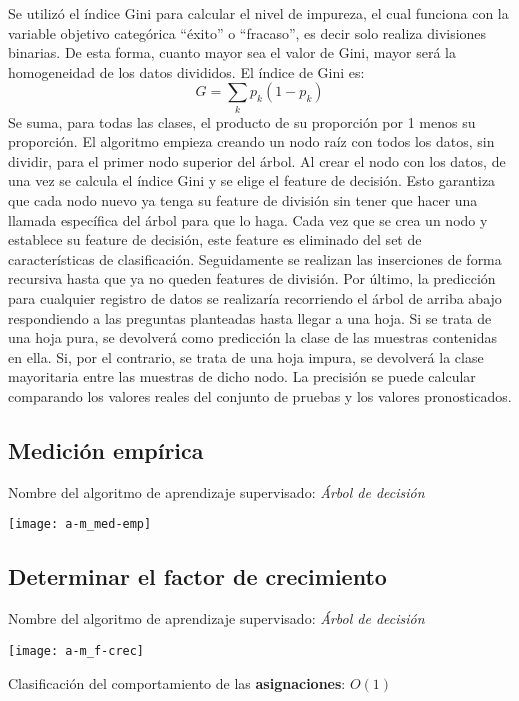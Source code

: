 \documentclass{article}
\begin{document}
Se utilizó el índice Gini para calcular el nivel de impureza, el cual funciona con la variable objetivo categórica “éxito” o  “fracaso”, es decir solo realiza divisiones binarias. De esta forma, cuanto mayor sea el valor de Gini, mayor será la homogeneidad de los datos divididos.
El índice de Gini es: \[G = \sum_{k}p_{k}(1-p_{k})\]
Se suma, para todas las clases, el producto de su proporción por 1 menos su proporción.
El algoritmo empieza creando un nodo raíz con todos los datos, sin dividir, para el primer nodo superior del árbol. Al crear el nodo con los datos, de una vez se calcula el índice Gini y se elige el feature de decisión. Esto garantiza que cada nodo nuevo ya tenga su feature de división sin tener que hacer una llamada específica del árbol para que lo haga. Cada vez que se crea un nodo y establece su feature de decisión, este feature es eliminado del set de características de clasificación.
Seguidamente se realizan las inserciones de forma recursiva hasta que ya no queden features de división.
Por último, la predicción para cualquier registro de datos se realizaría recorriendo el árbol de arriba abajo respondiendo a las preguntas planteadas hasta llegar a una hoja. Si se trata de una hoja pura, se devolverá como predicción la clase de las muestras contenidas en ella. Si, por el contrario, se trata de una hoja impura, se devolverá la clase mayoritaria entre las muestras de dicho nodo. La precisión se puede calcular comparando los valores reales del conjunto de pruebas y los valores pronosticados.

\subsection{Medición empírica}
Nombre del algoritmo de aprendizaje supervisado: \textit{Árbol de decisión}

\begin{center}
  \texttt{[image: a-m\_med-emp]}
\end{center}

\subsection{Determinar el factor de crecimiento}
Nombre del algoritmo de aprendizaje supervisado: \textit{Árbol de decisión}

\begin{center}
  \texttt{[image: a-m\_f-crec]}
\end{center}

Clasificación del comportamiento de las \textbf{asignaciones}: \(O(1)\)
\end{document}
